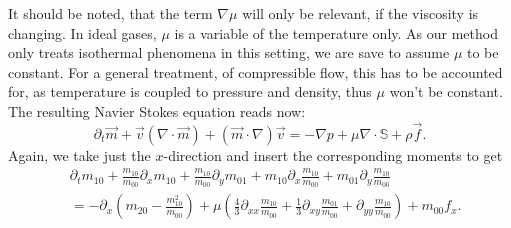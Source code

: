 It should be noted, that the term $\nabla \mu$ will only be relevant, if the viscosity is changing.
In ideal gases, $\mu$ is a variable of the temperature only.
As our method only treats isothermal phenomena in this setting, we are save to assume $\mu$ to be constant.
For a general treatment, of compressible flow, this has to be accounted for, as temperature is coupled to pressure and density, thus $\mu$ won't be constant.
The resulting Navier Stokes equation reads now:
\begin{equation}
  \label{eq:compressible NS isotherm}
  \partial_t \vec{m} + \vec{v}(\nabla \cdot \vec{m}) + (\vec{m} \cdot \nabla)\vec{v}
    = - \nabla p + \mu \nabla \cdot \mathbb{S} + \rho \vec{f}.
\end{equation}
Again, we take just the $x$-direction and insert the corresponding moments to get
\begin{equation}
  \label{eq: navier stokes goal}
  \begin{aligned}
    & \partial_t m_{10}
    + \frac{m_{10}}{m_{00}} \partial_x m_{10}
    + \frac{m_{10}}{m_{00}}\partial_y m_{01}
    + m_{10} \partial_x \frac{m_{10}}{m_{00}}
    + m_{01} \partial_y \frac{m_{10}}{m_{00}}
     \\
    & =
    - \partial_x \left(m_{20} - \frac{ m_{10}^2 }{ m_{00} } \right)
     + \mu \left(\frac{4}{3}\partial_{xx}\frac{m_{10}}{m_{00}}
            + \frac{1}{3}\partial_{xy} \frac{m_{01}}{m_{00}}
            + \partial_{yy} \frac{m_{10}}{m_{00}} \right) + m_{00}f_x.
  \end{aligned}
\end{equation}

